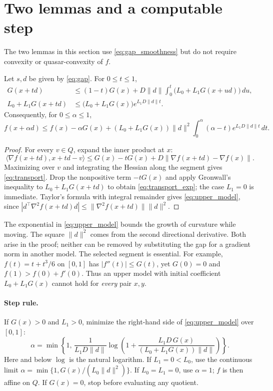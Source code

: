 \section{Two lemmas and a computable step}
The two lemmas in this section use \eqref{eq:gap_smoothness}
but do not require convexity or quasar-convexity of $f$.

\begin{lemma}\label{lem:transport}
Let $s,d$ be given by \eqref{eq:gap}. For $0\le t\le1$,
\begin{align}
 G(x+td)&\le(1-t)G(x)
    +D\|d\|\int_0^t\bigl(L_0+L_1G(x+ud)\bigr)\,du,
       \label{eq:transport}\\
 L_0+L_1G(x+td)&\le
      \bigl(L_0+L_1G(x)\bigr)e^{L_1D\|d\|t}.
       \label{eq:transport_exp}
\end{align}
Consequently, for $0\le\alpha\le1$,
\begin{equation}\label{eq:upper_model}
 f(x+\alpha d)\le f(x)-\alpha G(x)
 +(L_0+L_1G(x))\|d\|^2
       \int_0^\alpha(\alpha-t)e^{L_1D\|d\|t}\,dt.
\end{equation}
\end{lemma}
\begin{proof}
For every $v\in Q$, expand the inner product at $x$:
\[
 \langle\nabla f(x+td),x+td-v\rangle
 \le G(x)-tG(x)
       +D\|\nabla f(x+td)-\nabla f(x)\|.
\]
Maximizing over $v$ and integrating the Hessian along the segment
gives \eqref{eq:transport}. Drop the nonpositive term $-tG(x)$
and apply Gronwall's inequality to $L_0+L_1G(x+td)$ to obtain
\eqref{eq:transport_exp}; the case $L_1=0$ is immediate.
Taylor's formula with integral remainder gives \eqref{eq:upper_model},
since
$|d^\top\nabla^2f(x+td)d|\le\|\nabla^2f(x+td)\|\|d\|^2$.
\end{proof}

The exponential in \eqref{eq:upper_model} bounds the growth of
curvature while moving. The square $\|d\|^2$ comes from the second
directional derivative. Both arise in the proof; neither can be
removed by substituting the gap for a gradient norm in another model.
The selected segment is essential. For example,
$f(t)=t+t^3/6$ on $[0,1]$ has $|f''(t)|\le G(t)$, yet $G(0)=0$
and $f(1)>f(0)+f'(0)$. Thus an upper model with initial coefficient
$L_0+L_1G(x)$ cannot hold for \emph{every} pair $x,y$.

\paragraph{Step rule.}
If $G(x)>0$ and $L_1>0$, minimize the right-hand side of
\eqref{eq:upper_model} over $[0,1]$:
\begin{equation}\label{eq:log_step}
 \boxed{\displaystyle
 \alpha=\min\left\{1,\,
 \frac{1}{L_1D\|d\|}
 \log\left(1+
 \frac{L_1D\,G(x)}
 {(L_0+L_1G(x))\|d\|}\right)\right\}.}
\end{equation}
Here and below $\log$ is the natural logarithm.
If $L_1=0<L_0$, use the continuous limit
$\alpha=\min\{1,G(x)/(L_0\|d\|^2)\}$.
If $L_0=L_1=0$, use $\alpha=1$; $f$ is then affine on $Q$.
If $G(x)=0$, stop before evaluating any quotient.

